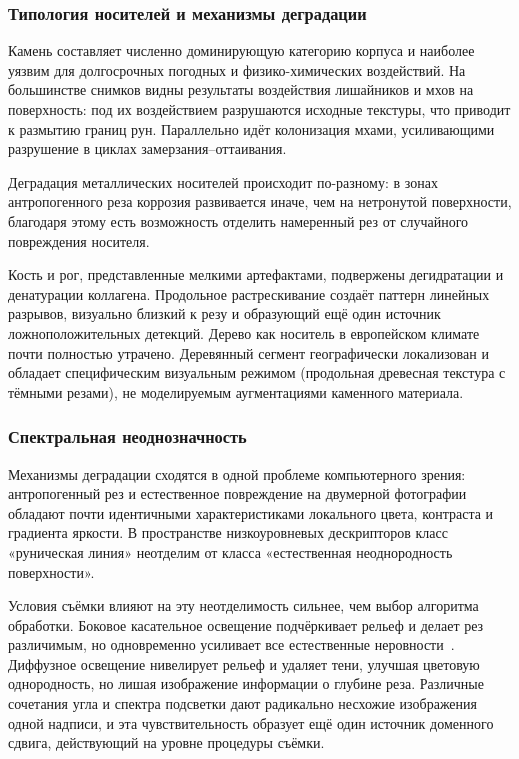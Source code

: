 \documentclass[a4paper,12pt]{extarticle}
\begin{document}
\subsubsection{Типология носителей и механизмы деградации}
 
Камень составляет численно доминирующую категорию корпуса и наиболее уязвим для долгосрочных погодных и физико-химических воздействий. На большинстве снимков видны результаты воздействия лишайников и мхов на поверхность: под их воздействием разрушаются исходные текстуры, что приводит к размытию границ рун. Параллельно идёт колонизация мхами, усиливающими разрушение в циклах замерзания--оттаивания. 

Деградация металлических носителей происходит по-разному: в зонах антропогенного реза коррозия развивается иначе, чем на нетронутой поверхности, благодаря этому есть возможность отделить намеренный рез от случайного повреждения носителя.
 
Кость и рог, представленные мелкими артефактами, подвержены дегидратации и денатурации коллагена. Продольное растрескивание создаёт паттерн линейных разрывов, визуально близкий к резу и образующий ещё один источник ложноположительных детекций. Дерево как носитель в европейском климате почти полностью утрачено. Деревянный сегмент географически локализован и обладает специфическим визуальным режимом (продольная древесная текстура с тёмными резами), не моделируемым аугментациями каменного материала.
 
\subsubsection{Спектральная неоднозначность}
 
Механизмы деградации сходятся в одной проблеме компьютерного зрения: антропогенный рез и естественное повреждение на двумерной фотографии обладают почти идентичными характеристиками локального цвета, контраста и градиента яркости. В пространстве низкоуровневых дескрипторов класс «руническая линия» неотделим от класса «естественная неоднородность поверхности».

Условия съёмки влияют на эту неотделимость сильнее, чем выбор алгоритма обработки. Боковое касательное освещение подчёркивает рельеф и делает рез различимым, но одновременно усиливает все естественные неровности~\cite{earl2010,calia2023}. Диффузное освещение нивелирует рельеф и удаляет тени, улучшая цветовую однородность, но лишая изображение информации о глубине реза. Различные сочетания угла и спектра подсветки дают радикально несхожие изображения одной надписи, и эта чувствительность образует ещё один источник доменного сдвига, действующий на уровне процедуры съёмки.
\end{document}

